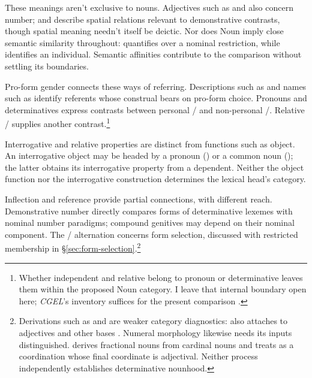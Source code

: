 \documentclass[12pt]{article}
\begin{document}
These meanings aren't exclusive to nouns. Adjectives such as  and  also concern number;  and  describe spatial relations relevant to demonstrative contrasts, though spatial meaning needn't itself be deictic. Nor does Noun imply close semantic similarity throughout:  quantifies over a nominal restriction, while  identifies an individual. Semantic affinities contribute to the comparison without settling its boundaries.

Pro-form gender \citep{reynolds2025proformgender} connects these ways of referring. Descriptions such as  and names such as  identify referents whose construal bears on pro-form choice. Pronouns and determinatives express contrasts between personal / and non-personal /. Relative / supplies another contrast.\footnote{Whether independent  and relative  belong to pronoun or determinative leaves them within the proposed Noun category. I leave that internal boundary open here; \textit{CGEL}'s inventory suffices for the present comparison \citep[397--399]{huddleston2002}.}

Interrogative and relative properties are distinct from functions such as object. An interrogative object may be headed by a pronoun () or a common noun (); the latter obtains its interrogative property from a dependent. Neither the object function nor the interrogative construction determines the lexical head's category.

Inflection and reference provide partial connections, with different reach. Demonstrative number directly compares forms of determinative lexemes with nominal number paradigms; compound genitives may depend on their nominal component. The /\allowbreak{} alternation concerns form selection, discussed with restricted membership in §\ref{sec:form-selection}.\footnote{Derivations such as  and  are weaker category diagnostics:  also attaches to adjectives and other bases \citep[Ch.~19, §5.7.2(i)]{huddleston2002}. Numeral morphology likewise needs its inputs distinguished. \textcite[§§5.4--5.5]{reynolds2026numerals} derives fractional nouns from cardinal nouns and treats  as a coordination whose final coordinate is adjectival. Neither process independently establishes determinative nounhood.}
\end{document}

